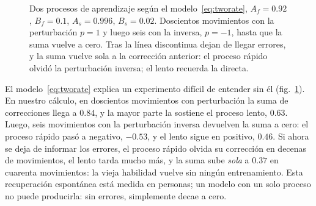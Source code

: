 \begin{figure}[t]
\centering
{}
\caption{Dos procesos de aprendizaje según el modelo~\eqref{eq:tworate}, $A_f=0.92$, $B_f=0.1$, $A_s=0.996$, $B_s=0.02$. Doscientos movimientos con la perturbación $p=1$ y luego seis con la inversa, $p=-1$, hasta que la suma vuelve a cero. Tras la línea discontinua dejan de llegar errores, y la suma vuelve sola a la corrección anterior: el proceso rápido olvidó la perturbación inversa; el lento recuerda la directa.}
\label{fig:tworate}
\end{figure}

El modelo~\eqref{eq:tworate} explica un experimento difícil de entender sin él (fig.~\ref{fig:tworate}). En nuestro cálculo, en doscientos movimientos con perturbación la suma de correcciones llega a $0.84$, y la mayor parte la sostiene el proceso lento, $0.63$. Luego, seis movimientos con la perturbación inversa devuelven la suma a cero: el proceso rápido pasó a negativo, $-0.53$, y el lento sigue en positivo, $0.46$. Si ahora se deja de informar los errores, el proceso rápido olvida su corrección en decenas de movimientos, el lento tarda mucho más, y la suma sube \emph{sola} a $0.37$ en cuarenta movimientos: la vieja habilidad vuelve sin ningún entrenamiento. Esta recuperación espontánea está medida en personas; un modelo con un solo proceso no puede producirla: sin errores, simplemente decae a cero.

